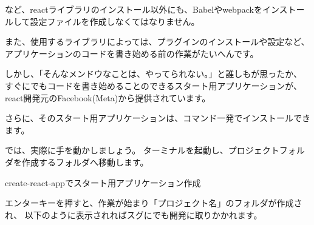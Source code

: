 \vspace*{\baselineskip}

など、reactライブラリのインストール以外にも、Babelやwebpackをインストールして設定ファイルを作成しなくてはなりません。

\vspace*{\baselineskip}

また、使用するライブラリによっては、プラグインのインストールや設定など、アプリケーションのコードを書き始める前の作業がたいへんです。

\vspace*{\baselineskip}

しかし、「そんなメンドウなことは、やってられない。」と誰しもが思ったか、
すぐにでもコードを書き始めることのできるスタート用アプリケーションが、react開発元のFacebook(Meta)から提供されています。

\vspace*{\baselineskip}

さらに、そのスタート用アプリケーションは、コマンド一発でインストールできます。

\vspace*{\baselineskip}

では、実際に手を動かしましょう。
ターミナルを起動し、プロジェクトフォルダを作成するフォルダへ移動します。

\def\startercodeblockfontsize{}
\begin{starterterminal}[]{create{-}react{-}appでスタート用アプリケーション作成}\end{starterterminal}

エンターキーを押すと、作業が始まり「プロジェクト名」のフォルダが作成され、
以下のように表示されればスグにでも開発に取りかかれます。

